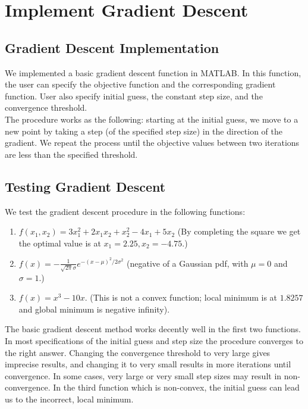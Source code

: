 
\section{Implement Gradient Descent}\label{sec:grad_desc}

\subsection{Gradient Descent Implementation}
We implemented a basic gradient descent function in MATLAB. In this function, the user can specify the objective function and the corresponding gradient function. User also specify initial guess, the constant step size, and the convergence threshold. \\
The procedure works as the following: starting at the initial guess, we move to a new point by taking a step (of the specified step size) in the direction of the gradient. We repeat the process until the objective values between two iterations are less than the specified threshold.

\subsection{Testing Gradient Descent}
We test the gradient descent procedure in the following functions:
\begin{enumerate}
\item $f(x_1, x_2) = 3x_1^2 + 2x_1x_2 + x_2^2 - 4x_1 + 5x_2$ (By completing the square we get the optimal value is at $x_1 = 2.25, x_2 = -4.75$.)
\item $f(x) = -\frac{1}{\sqrt{2\pi}\sigma}e^{-(x-\mu)^2/2\sigma^2}$ (negative of a Gaussian pdf, with $\mu = 0$ and $\sigma = 1$.)
\item $f(x) = x^3 - 10x$. (This is not a convex function; local minimum is at $1.8257$ and global minimum is negative infinity).
\end{enumerate}

The basic gradient descent method works decently well in the first two functions. In most specifications of the initial guess and step size the procedure converges to the right answer. Changing the convergence threshold to very large gives imprecise results, and changing it to very small results in more iterations until convergence. In some cases, very large or very small step sizes may result in non-convergence. In the third function which is non-convex, the initial guess can lead us to the incorrect, local minimum.  

